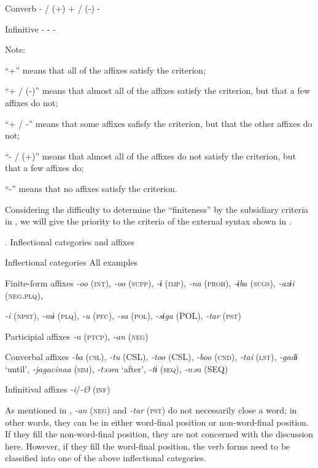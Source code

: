 Converb  {}- / (+)  + / (-)  {}-

Infinitive  {}-  {}-  {}-

Note:

  “+” means that all of the affixes satisfy the criterion;

“+ / (-)” means that almost all of the affixes satisfy the criterion, but that a few affixes do not;

“+ / -” means that some affixes safisfy the criterion, but that the other affixes do not;

“- / (+)” means that almost all of the affixes do not satisfy the criterion, but that a few affixes do;

“-” means that no affixes satisfy the criterion.

Considering the difficulty to determine the “finiteness” by the subsidiary criteria in , we will give the priority to the criteria of the external syntax shown in .

\begin{styleBeschriftung}
\textmd{. Inflectional categories and affixes}
\end{styleBeschriftung}

Inflectional categories  All examples

Finite-form affixes  \textit{{}-oo} (\textsc{int}), \textit{{}-oo} (\textsc{supp}), \textit{{}-ɨ} (\textsc{imp}), \textit{{}-na} (\textsc{proh}), \textit{{}-ɨba} (\textsc{sugs}), \textit{{}-azɨi} (\textsc{neg}.\textsc{plq}),

\textit{{}-i} (\textsc{npst}), \textit{{}-mɨ} (\textsc{plq}), \textit{{}-u} (\textsc{pfc}), \textit{{}-sa} (\textsc{pol}), \textit{{}-sɨga} (POL), \textit{{}-tar} (\textsc{pst})

Participial affixes  \textit{{}-n} (\textsc{ptcp}), \textit{{}-an} (\textsc{neg})

Converbal affixes  \textit{{}-ba} (\textsc{csl}), \textit{{}-tu} (CSL), \textit{{}-too} (CSL), \textit{{}-boo} (\textsc{cnd}), \textit{{}-tai} (\textsc{lst}), \textit{{}-gadɨ} ‘until’, \textit{{}-jagacinaa} (\textsc{sim}), \textit{{}-təəra} ‘after’, \textit{{}-tɨ} (\textsc{seq}), \textit{{}-nən} (SEQ)

Infinitival affixes  \textit{{}-i}/\textit{{}-Ø} (\textsc{inf})

As mentioned in , \textit{{}-an} (\textsc{neg}) and \textit{{}-tar} (\textsc{pst}) do not necessarily close a word; in other words, they can be in either word-final position or non-word-final position. If they fill the non-word-final position, they are not concerned with the discussion here. However, if they fill the word-final position, the verb forms need to be classified into one of the above inflectional categories.


